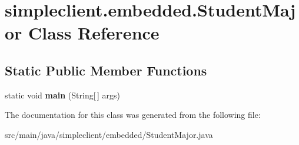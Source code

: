 \hypertarget{classsimpleclient_1_1embedded_1_1StudentMajor}{}\section{simpleclient.\+embedded.\+Student\+Major Class Reference}
\label{classsimpleclient_1_1embedded_1_1StudentMajor}
\subsection*{Static Public Member Functions}
\begin{DoxyCompactItemize}
\item 
\mbox{\label{classsimpleclient_1_1embedded_1_1StudentMajor_a266474f704ba114c626918edd2818c1d}} 
static void {\bfseries main} (String\mbox{[}$\,$\mbox{]} args)
\end{DoxyCompactItemize}


The documentation for this class was generated from the following file\+:\begin{DoxyCompactItemize}
\item 
src/main/java/simpleclient/embedded/Student\+Major.\+java\end{DoxyCompactItemize}
